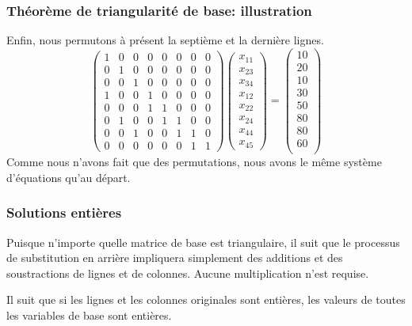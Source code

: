 \documentclass[usepdftitle=false]{beamer}
\begin{document}
\begin{frame}
\frametitle{Théorème de triangularité de base: illustration}

Enfin, nous permutons à présent la septième et la dernière lignes.
\[
\begin{pmatrix}
 1 & 0 & 0 & 0 & 0 & 0 & 0 & 0 \\
 0 & 1 & 0 & 0 & 0 & 0 & 0 & 0 \\
 0 & 0 & 1 & 0 & 0 & 0 & 0 & 0 \\
 1 & 0 & 0 & 1 & 0 & 0 & 0 & 0 \\
 0 & 0 & 0 & 1 & 1 & 0 & 0 & 0 \\
 0 & 1 & 0 & 0 & 1 & 1 & 0 & 0 \\
 0 & 0 & 1 & 0 & 0 & 1 & 1 & 0 \\
 0 & 0 & 0 & 0 & 0 & 0 & 1 & 1
\end{pmatrix}
\begin{pmatrix}
x_{11} \\
x_{23} \\
x_{34} \\
x_{12} \\
x_{22} \\
x_{24} \\
x_{44} \\
x_{45}
\end{pmatrix}
=
\begin{pmatrix}
10 \\
20 \\
10 \\
30 \\
50 \\
80 \\
80 \\
60 \\
\end{pmatrix}
\]
Comme nous n'avons fait que des permutations, nous avons le même système d'équations qu'au départ.

\end{frame}

\begin{frame}
\frametitle{Solutions entières}

Puisque n'importe quelle matrice de base est triangulaire, il suit que le processus de substitution en arrière impliquera simplement des additions et des soustractions de lignes et de colonnes. Aucune multiplication n'est requise.

\mbox{}

Il suit que si les lignes et les colonnes originales sont entières, les valeurs de toutes les variables de base sont entières.

\end{frame}
\end{document}
